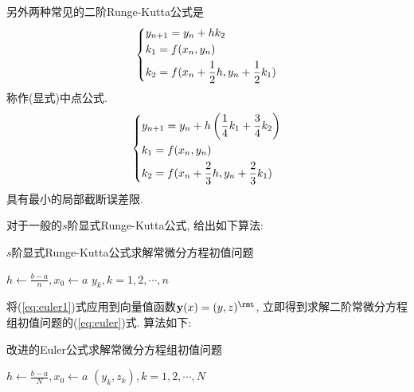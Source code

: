 \documentclass{nedsart}
\begin{document}
另外两种常见的二阶Runge-Kutta公式是
\begin{equation}
    \begin{dcases}
        y_{n+1} = y_n + h k_2 \\
        k_1 = f(x_n, y_n) \\
        k_2 = f(x_n + \frac{1}{2} h, y_n + \frac{1}{2} k_1)
    \end{dcases}
\end{equation}
称作(显式)中点公式.
\begin{equation}
    \begin{dcases}\label{eq:ralston}
        y_{n+1} = y_n + h \left(\frac{1}{4} k_1 + \frac{3}{4} k_2\right) \\
        k_1 = f(x_n, y_n) \\
        k_2 = f(x_n + \frac{2}{3} h, y_n + \frac{2}{3} k_1)
    \end{dcases}
\end{equation}
具有最小的局部截断误差限.

对于一般的$s$阶显式Runge-Kutta公式, 给出如下算法:

\begin{algorithm}[H]
    \caption{$s$阶显式Runge-Kutta公式求解常微分方程初值问题}

    $h \leftarrow \frac{b - a}{n}, x_0 \leftarrow a$\;
    \KwRet $y_k, k = 1,2,\cdots,n$\;
\end{algorithm}

将(\ref{eq:euler1})式应用到向量值函数$\mathbf{y}(x)=(y,z)^\rmt$, 立即得到求解二阶常微分方程组初值问题的(\ref{eq:euler})式. 算法如下:

\begin{algorithm}[H]
    \caption{改进的Euler公式求解常微分方程组初值问题}

    $h \leftarrow \frac{b - a}{N}, x_0 \leftarrow a$\;
    \KwRet $(y_k, z_k), k = 1,2,\cdots,N$\;
\end{algorithm}
\end{document}
